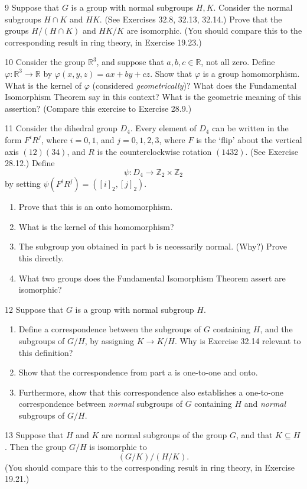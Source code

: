 \begin{problem}{9}
    Suppose that $G$ is a group with normal subgroups $H, K$. Consider the normal subgroups
    $H \cap K$ and $HK$. (See Exercises 32.8, 32.13, 32.14.) Prove that the groups
    $H/(H \cap K)$ and $HK/K$ are isomorphic. (You should compare this to the corresponding
    result in ring theory, in Exercise 19.23.)
\end{problem}
\unsolved

\begin{problem}{10}
    Consider the group $\mathbb{R}^3$, and suppose that $a, b, c \in \mathbb{R}$, not all
    zero. Define $\varphi : \mathbb{R}^3 \to \mathbb{R}$ by $\varphi(x, y, z) = ax + by + cz$.
    Show that $\varphi$ is a group homomorphism. What is the kernel of $\varphi$
    (considered \emph{geometrically})? What does the Fundamental Isomorphism Theorem say in
    this context? What is the geometric meaning of this assertion? (Compare this exercise
    to Exercise 28.9.)
\end{problem}
\unsolved

\begin{problem}{11}
    Consider the dihedral group $D_4$. Every element of $D_4$ can be written in the form
    $F^iR^j$, where $i = 0, 1$, and $j = 0, 1, 2, 3$, where $F$ is the `flip' about the
    vertical axis $(12)(34)$, and $R$ is the counterclockwise rotation $(1432)$. (See
    Exercise 28.12.) Define
    \[\psi : D_4 \to \mathbb{Z}_2 \times \mathbb{Z}_2\]
    by setting $\psi(F^iR^j) = ([i]_2, [j]_2)$.
    \begin{enumerate}
        \item[(a)] Prove that this is an onto homomorphism.
        \item[(b)] What is the kernel of this homomorphism?
        \item[(c)] The subgroup you obtained in part b is necessarily normal. (Why?) Prove
        this directly.
        \item[(d)] What two groups does the Fundamental Isomorphism Theorem assert are
        isomorphic?
    \end{enumerate}
\end{problem}
\unsolved

\begin{problem}{12}
    Suppose that $G$ is a group with normal subgroup $H$.
    \begin{enumerate}
        \item[(a)] Define a correspondence between the subgroups of $G$ containing $H$, and
        the subgroups of $G/H$, by assigning $K \to K/H$. Why is Exercise 32.14 relevant to
        this definition?
        \item[(b)] Show that the correspondence from part a is one-to-one and onto.
        \item[(c)] Furthermore, show that this correspondence also establishes a one-to-one
        correspondence between \emph{normal} subgroups of $G$ containing $H$ and
        \emph{normal} subgroups of $G/H$.
    \end{enumerate}
\end{problem}
\unsolved

\begin{problem}{13}
    Suppose that $H$ and $K$ are normal subgroups of the group $G$, and that
    $K \subseteq H$. Then the group $G/H$ is isomorphic to
    \[(G/K)/(H/K).\]
    (You should compare this to the corresponding result in ring theory, in
    Exercise 19.21.)
\end{problem}
\unsolved
